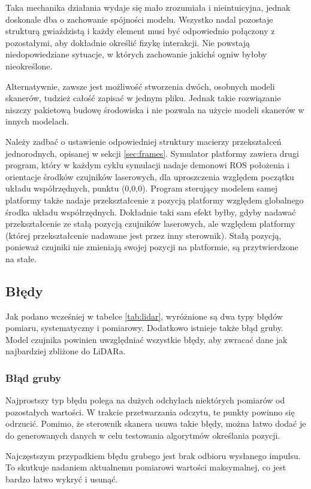 			Taka mechanika działania wydaje się mało zrozumiała i nieintuicyjna, jednak doskonale dba o zachowanie spójności modelu.
			Wszystko nadal pozostaje strukturą gwiaździstą i każdy element musi być odpowiednio połączony z pozostałymi, aby dokładnie określić fizykę interakcji.
			Nie powstają niedopowiedziane sytuacje, w których zachowanie jakichś ogniw byłoby nieokreślone.

			Alternatywnie, zawsze jest możliwość stworzenia dwóch, osobnych modeli skanerów, tudzież całość zapisać w jednym pliku.
			Jednak takie rozwiązanie niszczy pakietową budowę środowiska i nie pozwala na użycie modeli skanerów w innych modelach.
			
			Należy zadbać o ustawienie odpowiedniej struktury macierzy przekształceń jednorodnych, opisanej w sekcji \ref{sec:frames}.
			Symulator platformy zawiera drugi program, który w każdym cyklu symulacji nadaje demonowi ROS położenia i orientacje środków czujników laserowych, dla uproszczenia
			względem początku układu współrzędnych, punktu (0,0,0). 
			Program sterujący modelem samej platformy także nadaje przekształcenie z pozycją platformy względem globalnego środka układu współrzędnych.
			Dokładnie taki sam efekt byłby, gdyby nadawać przekształcenie ze stałą pozycją czujników laserowych, ale względem platformy (której przekształcenie nadawane jest przez inny sterownik).
			Stałą pozycją, ponieważ czujniki nie zmieniają swojej pozycji na platformie, są przytwierdzone na stałe.

	\subsection{Błędy}
		Jak podano wcześniej w tabelce \ref{tab:lidar}, wyróżnione są dwa typy błędów pomiaru, systematyczny i pomiarowy.
		Dodatkowo istnieje także błąd gruby.
		Model czujnika powinien uwzględniać wszystkie błędy, aby zwracać dane jak najbardziej zbliżone do LiDARa.

		\subsubsection{Błąd gruby}
			Najprostszy typ błędu polega na dużych odchyłach niektórych pomiarów od pozostałych wartości.
			W trakcie przetwarzania odczytu, te punkty powinno się odrzucić.
			Pomimo, że sterownik skanera usuwa takie błędy, można łatwo dodać je do generowanych danych w celu testowania algorytmów określania pozycji.

			Najczęstszym przypadkiem błędu grubego jest brak odbioru wysłanego impulsu. 
			To skutkuje nadaniem aktualnemu pomiarowi wartości maksymalnej, co jest bardzo łatwo wykryć i usunąć.

